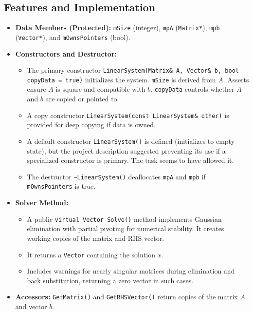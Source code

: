 \subsection{Features and Implementation}
\begin{sloppypar}
\begin{itemize}
    \item \textbf{Data Members (Protected):} \texttt{mSize} (integer), \texttt{mpA} (\texttt{Matrix*}), \texttt{mpb} (\texttt{Vector*}), and \texttt{mOwnsPointers} (bool).
    \item \textbf{Constructors and Destructor:}
        \begin{itemize}
            \item The primary constructor \texttt{LinearSystem(Matrix\& A, Vector\& b, bool copyData = true)} initializes the system. \texttt{mSize} is derived from $A$. Asserts ensure $A$ is square and compatible with $b$. \texttt{copyData} controls whether $A$ and $b$ are copied or pointed to.
            \item A copy constructor \texttt{LinearSystem(const LinearSystem\& other)} is provided for deep copying if data is owned.
            \item A default constructor \texttt{LinearSystem()} is defined (initializes to empty state), but the project description suggested preventing its use if a specialized constructor is primary. The task seems to have allowed it.
            \item The destructor \texttt{\textasciitilde LinearSystem()} deallocates \texttt{mpA} and \texttt{mpb} if \texttt{mOwnsPointers} is true.
        \end{itemize}
    \item \textbf{Solver Method:}
        \begin{itemize}
            \item A public \texttt{virtual Vector Solve()} method implements Gaussian elimination with partial pivoting for numerical stability. It creates working copies of the matrix and RHS vector.
            \item It returns a \texttt{Vector} containing the solution $x$.
            \item Includes warnings for nearly singular matrices during elimination and back substitution, returning a zero vector in such cases.
        \end{itemize}
    \item \textbf{Accessors:} \texttt{GetMatrix()} and \texttt{GetRHSVector()} return copies of the matrix $A$ and vector $b$.
\end{itemize}
\end{sloppypar}

